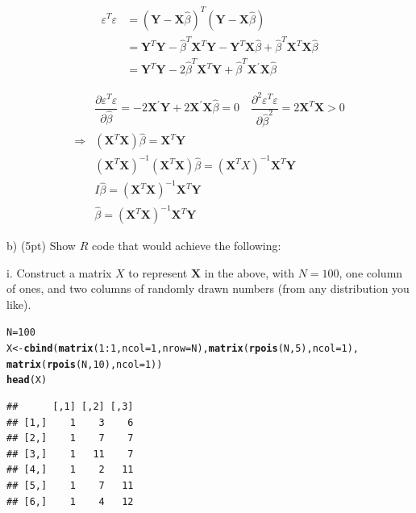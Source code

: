 \documentclass{article}\usepackage[]{graphicx}\usepackage[]{color}
\makeatletter
\newcommand{\hlnum}[1]{\textcolor[rgb]{0.686,0.059,0.569}{#1}}%
\newcommand{\hlopt}[1]{\textcolor[rgb]{0,0,0}{#1}}%
\newcommand{\hlstd}[1]{\textcolor[rgb]{0.345,0.345,0.345}{#1}}%
\newcommand{\hlkwb}[1]{\textcolor[rgb]{0.69,0.353,0.396}{#1}}%
\newcommand{\hlkwc}[1]{\textcolor[rgb]{0.333,0.667,0.333}{#1}}%
\newcommand{\hlkwd}[1]{\textcolor[rgb]{0.737,0.353,0.396}{\textbf{#1}}}%
\newenvironment{kframe}{%
 \def\at@end@of@kframe{}%
 \ifinner\ifhmode%
  \def\at@end@of@kframe{\end{minipage}}%
  \begin{minipage}{\columnwidth}%
 \fi\fi%
 \def\FrameCommand##1{\hskip\@totalleftmargin \hskip-\fboxsep
 \colorbox{shadecolor}{##1}\hskip-\fboxsep
     \hskip-\linewidth \hskip-\@totalleftmargin \hskip\columnwidth}%
 \MakeFramed {\advance\hsize-\width
   \@totalleftmargin\z@ \linewidth\hsize
   \@setminipage}}%
 {\par\unskip\endMakeFramed%
 \at@end@of@kframe}
\newenvironment{knitrout}{}{} %
\makeatother
\begin{document}
$$
\begin{aligned}
\varepsilon^{T} \varepsilon &=(\mathbf{Y}-\mathbf{X} \hat{\beta})^{T}(\mathbf{Y}-\mathbf{X} \hat{\beta}) \\
&=\mathbf{Y}^{T} \mathbf{Y}-\hat{\beta}^{T} \mathbf{X}^{T} \mathbf{Y}-\mathbf{Y}^{T} \mathbf{X} \hat{\beta}+\hat{\beta}^{T} \mathbf{X}^{T} \mathbf{X} \hat{\beta} \\
&=\mathbf{Y}^{T} \mathbf{Y}-2 \hat{\beta}^{T} \mathbf{X}^{T} \mathbf{Y}+\hat{\beta}^{T} \mathbf{X}^{\prime} \mathbf{X} \hat{\beta}
\end{aligned} 
$$


$$
\begin{aligned}
&\dfrac{\partial \varepsilon^{T} \varepsilon}{\partial \hat{\beta}}=-2 \mathbf{X}^{\prime} \mathbf{Y}+2 \mathbf{X}^{\prime} \mathbf{X} \hat{\beta}=0 \quad
\dfrac{\partial^2 \varepsilon^{T} \varepsilon}{\partial \hat{\beta}^2}= 2 \mathbf{X}^{T} \mathbf{X} >0
\\
\Rightarrow 
&\left(\mathbf{X}^{T} \mathbf{X}\right) \hat{\beta}=\mathbf{X}^{T} \mathbf{Y}
\\
&\left(\mathbf{X}^{T} \mathbf{X}\right)^{-1}\left(\mathbf{X}^{T} \mathbf{X}\right) \hat{\beta}=\left(\mathbf{X}^{T} X\right)^{-1} \mathbf{X}^{T}\mathbf{Y}
\\
&I \hat{\beta} =\left(\mathbf{X}^{T} \mathbf{X}\right)^{-1} \mathbf{X}^{T} \mathbf{Y} \\
&\hat{\beta} =\left(\mathbf{X}^{T} \mathbf{X}\right)^{-1} \mathbf{X}^{T} \mathbf{Y}
\end{aligned}
$$
\vspace*{0.5cm}


b) (5pt) Show $R$ code that would achieve the following:

i. Construct a matrix $X$ to represent $\mathbf{X}$ in the above, with $N=100$, one column of ones, and two columns of randomly drawn numbers (from any distribution you like).

\begin{knitrout}
\color{fgcolor}\begin{kframe}
\begin{alltt}
\hlstd{N} \hlkwb{=} \hlnum{100}
\hlstd{X} \hlkwb{<-} \hlkwd{cbind}\hlstd{(}\hlkwd{matrix}\hlstd{(}\hlnum{1}\hlopt{:}\hlnum{1}\hlstd{,} \hlkwc{ncol} \hlstd{=} \hlnum{1}\hlstd{,} \hlkwc{nrow} \hlstd{= N),}  \hlkwd{matrix}\hlstd{(}\hlkwd{rpois}\hlstd{(N,} \hlnum{5}\hlstd{),} \hlkwc{ncol} \hlstd{=} \hlnum{1}\hlstd{),}
           \hlkwd{matrix}\hlstd{(}\hlkwd{rpois}\hlstd{(N,} \hlnum{10}\hlstd{),} \hlkwc{ncol} \hlstd{=} \hlnum{1}\hlstd{))}
\hlkwd{head}\hlstd{(X)}
\end{alltt}
\begin{verbatim}
##      [,1] [,2] [,3]
## [1,]    1    3    6
## [2,]    1    7    7
## [3,]    1   11    7
## [4,]    1    2   11
## [5,]    1    7   11
## [6,]    1    4   12
\end{verbatim}
\end{kframe}
\end{knitrout}
\vspace*{0.5cm}
\end{document}
